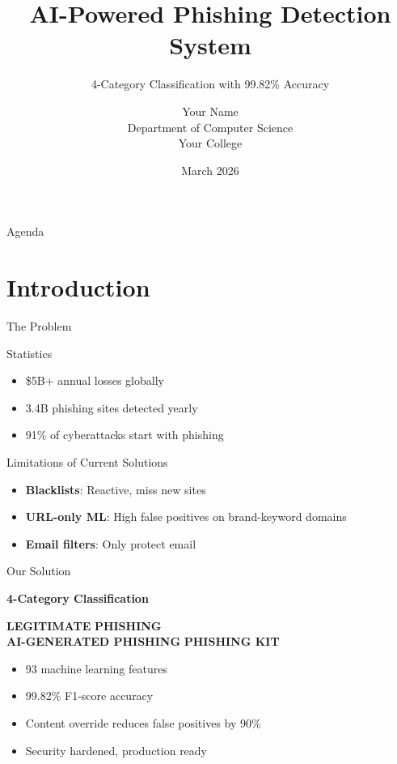 \documentclass[10pt, aspectratio=169]{beamer}
\title{AI-Powered Phishing Detection System}
\subtitle{4-Category Classification with 99.82\% Accuracy}
\author{Your Name \\ \small{Department of Computer Science} \\ \small{Your College}}
\date{March 2026}
\begin{document}
\frame{\titlepage}

\begin{frame}{Agenda}
    \tableofcontents
\end{frame}

\section{Introduction}

\begin{frame}{The Problem}
    \begin{block}{Statistics}
        \begin{itemize}
            \item \$5B+ annual losses globally
            \item 3.4B phishing sites detected yearly
            \item 91\% of cyberattacks start with phishing
        \end{itemize}
    \end{block}
    
    \begin{block}{Limitations of Current Solutions}
        \begin{itemize}
            \item \textbf{Blacklists}: Reactive, miss new sites
            \item \textbf{URL-only ML}: High false positives on brand-keyword domains
            \item \textbf{Email filters}: Only protect email
        \end{itemize}
    \end{block}
\end{frame}

\begin{frame}{Our Solution}
    \begin{center}
        \Large
        \textbf{4-Category Classification}
        
        \begin{tcolorbox}[colback=blue!5!white,colframe=blue!75!black,width=0.8\textwidth]
            \centering
            \textbf{LEGITIMATE} \hspace{1cm} \textbf{PHISHING} \\
            \textbf{AI-GENERATED PHISHING} \hspace{1cm} \textbf{PHISHING KIT}
        \end{tcolorbox}
    \end{center}
    
    \vspace{5mm}
    \begin{itemize}
        \item 93 machine learning features
        \item 99.82\% F1-score accuracy
        \item Content override reduces false positives by 90\%
        \item Security hardened, production ready
    \end{itemize}
\end{frame}
\end{document}
